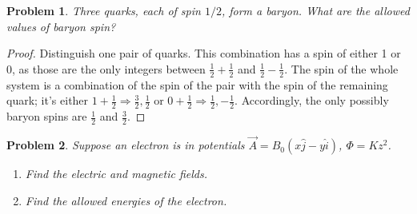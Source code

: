 \documentclass{article}
\newtheorem{plm}{Problem}
\begin{document}
\begin{plm}
  Three quarks, each of spin $1/2$, form a baryon.
  What are the allowed values of baryon spin?
\end{plm}

\begin{proof}
  Distinguish one pair of quarks.
  This combination has a spin of either 1 or 0, as those are the only integers between $\frac{1}{2} + \frac{1}{2}$ and $\frac{1}{2} - \frac{1}{2}$.
  The spin of the whole system is a combination of the spin of the pair with the spin of the remaining quark;
  it's either $1 + \frac{1}{2} \Rightarrow \frac{3}{2}, \frac{1}{2}$ or $0 + \frac{1}{2} \Rightarrow \frac{1}{2}, -\frac{1}{2}$.
  Accordingly, the only possibly baryon spins are $\frac{1}{2}$ and $\frac{3}{2}$.
\end{proof}

\begin{plm}
  Suppose an electron is in potentials $\vec{A} = B_{0}(x\hat{j} - y\hat{i})$, $\Phi = Kz^{2}$.
  \begin{enumerate}
  \item Find the electric and magnetic fields.
  \item Find the allowed energies of the electron.
  \end{enumerate}
\end{plm}
\end{document}
